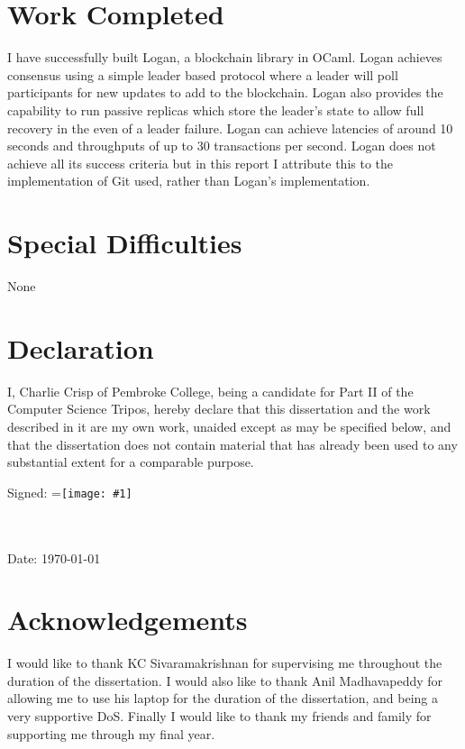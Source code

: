 \documentclass[12pt,a4paper,twoside,openright]{report}
\newcommand{\vcenteredinclude}[1]{\begingroup
	\setbox0=\hbox{\texttt{[image: \#1]}}%
	\parbox{\wd0}{\box0}\endgroup}
\begin{document}
	\section*{Work Completed}
	
	I have successfully built Logan, a blockchain library in OCaml.
	Logan achieves consensus using a simple leader based protocol where a leader will poll participants for new updates to add to the blockchain.
	Logan also provides the capability to run passive replicas which store the leader's state to allow full recovery in the even of a leader failure.
	Logan can achieve latencies of around 10 seconds and throughputs of up to 30 transactions per second. 
	Logan does not achieve all its success criteria but in this report I attribute this to the implementation of Git used, rather than Logan's implementation.
	
	\section*{Special Difficulties}
	
	None
	
	\newpage
	\section*{Declaration}
	
	I, Charlie Crisp of Pembroke College, being a candidate for Part II of the Computer
	Science Tripos, hereby declare that this dissertation and the work described in it are my own work,
	unaided except as may be specified below, and that the dissertation
	does not contain material that has already been used to any substantial
	extent for a comparable purpose.
	
	\bigskip
	\noindent 
	Signed:
	\vcenteredinclude{figs/signature.png} \\ \\
	\bigskip
	\noindent 
	Date: \space \space \space \today
	
	\tableofcontents
	
	\listoffigures
	
	\newpage
	\section*{Acknowledgements}
	
	I would like to thank KC Sivaramakrishnan for supervising me throughout the duration of the dissertation.
	I would also like to thank Anil Madhavapeddy for allowing me to use his laptop for the duration of the dissertation, and being a very supportive DoS.
	Finally I would like to thank my friends and family for supporting me through my final year.
	
\end{document}
